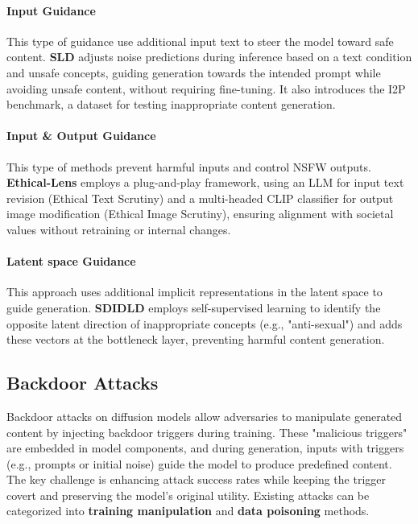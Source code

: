 \paragraph{Input Guidance} 
This type of guidance use additional input text to steer the model toward safe content. 
\textbf{SLD} \cite{schramowski2023safe} adjusts noise predictions during inference based on a text condition and unsafe concepts, guiding generation towards the intended prompt while avoiding unsafe content, without requiring fine-tuning. It also introduces the I2P benchmark, a dataset for testing inappropriate content generation.

\paragraph{Input \& Output Guidance}
This type of methods prevent harmful inputs and control NSFW outputs. \textbf{Ethical-Lens} \cite{cai2024ethical} employs a plug-and-play framework, using an LLM for input text revision (Ethical Text Scrutiny) and a multi-headed CLIP classifier for output image modification (Ethical Image Scrutiny), ensuring alignment with societal values without retraining or internal changes.


\paragraph{Latent space Guidance} 
This approach uses additional implicit representations in the latent space to guide generation. \textbf{SDIDLD} \cite{li2024self} employs self-supervised learning to identify the opposite latent direction of inappropriate concepts (e.g., "anti-sexual") and adds these vectors at the bottleneck layer, preventing harmful content generation.


\subsection{Backdoor Attacks}
\label{sec:dm_backdoor_attacks}

Backdoor attacks on diffusion models allow adversaries to manipulate generated content by injecting backdoor triggers during training. These "malicious triggers" are embedded in model components, and during generation, inputs with triggers (e.g., prompts or initial noise) guide the model to produce predefined content. The key challenge is enhancing attack success rates while keeping the trigger covert and preserving the model's original utility. Existing attacks can be categorized into \textbf{training manipulation} and \textbf{data poisoning} methods.

